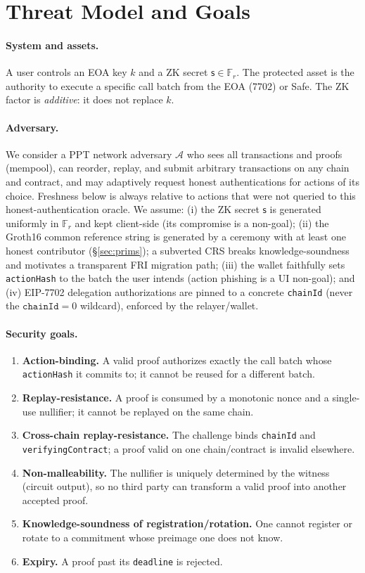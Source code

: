 \documentclass[11pt]{article}
\theoremstyle{definition}
\theoremstyle{plain}
\newcommand{\Fr}{\mathbb{F}_r}       %
\newcommand{\secret}{\mathsf{s}}
\begin{document}
\section{Threat Model and Goals}
\label{sec:threat}

\paragraph{System and assets.} A user controls an EOA key $k$ and a ZK secret
$\secret \in \Fr$. The protected asset is the authority to execute a specific call
batch from the EOA (7702) or Safe. The ZK factor is \emph{additive}: it does not
replace $k$.

\paragraph{Adversary.} We consider a PPT network adversary $\mathcal{A}$ who sees all
transactions and proofs (mempool), can reorder, replay, and submit arbitrary
transactions on any chain and contract, and may adaptively request honest
authentications for actions of its choice. Freshness below is always relative to
actions that were not queried to this honest-authentication oracle. We assume:
(i) the ZK secret $\secret$ is
generated uniformly in $\Fr$ and kept client-side (its compromise is a non-goal);
(ii) the Groth16 common reference string is generated by a ceremony with at least one
honest contributor (\S\ref{sec:prims}); a subverted CRS breaks knowledge-soundness
and motivates a transparent FRI migration path; (iii) the wallet faithfully sets
\texttt{actionHash} to the batch the user intends (action phishing is a UI non-goal);
and (iv) EIP-7702 delegation authorizations are pinned to a concrete
\texttt{chainId} (never the $\texttt{chainId}=0$ wildcard), enforced by the
relayer/wallet.

\paragraph{Security goals.}
\begin{enumerate}
  \item \textbf{Action-binding.} A valid proof authorizes exactly the call batch
  whose \texttt{actionHash} it commits to; it cannot be reused for a different batch.
  \item \textbf{Replay-resistance.} A proof is consumed by a monotonic nonce and a
  single-use nullifier; it cannot be replayed on the same chain.
  \item \textbf{Cross-chain replay-resistance.} The challenge binds \texttt{chainId}
  and \texttt{verifyingContract}; a proof valid on one chain/contract is invalid
  elsewhere.
  \item \textbf{Non-malleability.} The nullifier is uniquely determined by the
  witness (circuit output), so no third party can transform a valid proof into another
  accepted proof.
  \item \textbf{Knowledge-soundness of registration/rotation.} One cannot register
  or rotate to a commitment whose preimage one does not know.
  \item \textbf{Expiry.} A proof past its \texttt{deadline} is rejected.
\end{enumerate}
\end{document}
